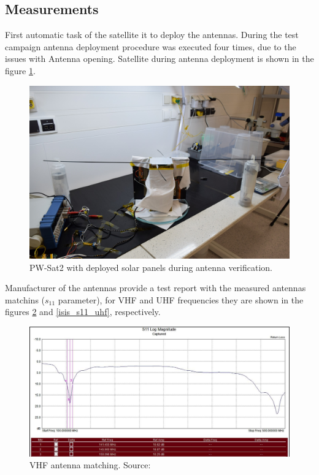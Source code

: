 \subsection{Measurements}
First automatic task of the satellite it to deploy the antennas. During the test campaign antenna deployment procedure was executed four times, due to the issues with Antenna opening. Satellite during antenna deployment is shown in the figure \ref{pwsat_with_deployed_antennas}.

\begin{figure}
    \centering
    \includegraphics[width=0.6\paperwidth]{img/6/pwsat_with_deployed_antennas.JPG}
    \caption{PW-Sat2 with deployed solar panels during antenna verification.}
    \label{pwsat_with_deployed_antennas}
\end{figure}

Manufacturer of the antennas provide a test report with the measured antennas matchins ($s_{11}$ parameter), for VHF and UHF frequencies they are shown in the figures \ref{isis_s11_vhf} and  \ref{isis_s11_uhf}, respectively.

\begin{figure}
    \centering
    \includegraphics[width=0.8\paperwidth]{img/6/isis_s11_vhf.png}
    \caption{VHF antenna matching. Source: \cite{isis_ant_test_report}}
    \label{isis_s11_vhf}
\end{figure}

